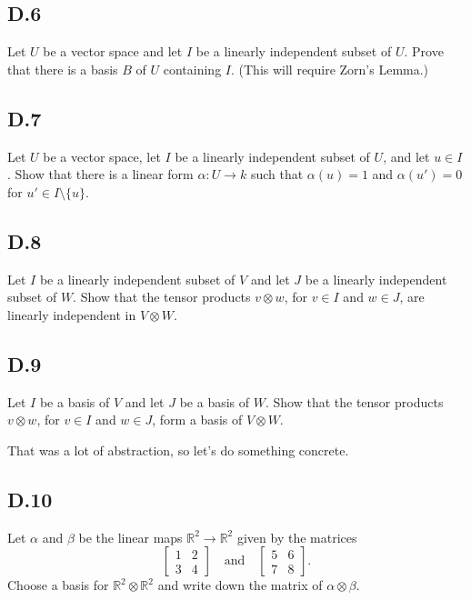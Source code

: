 \documentclass[lang=cn,11pt]{template}
\begin{document}
\subsection*{D.6} Let \( U \) be a vector space and let \( I \) be a linearly independent subset of \( U \). Prove that there is a basis \( B \) of \( U \) containing \( I \). (This will require Zorn’s Lemma.)

\subsection*{D.7} Let \( U \) be a vector space, let \( I \) be a linearly independent subset of \( U \), and let \( u \in I \). Show that there is a linear form \( \alpha : U \to k \) such that \( \alpha(u) = 1 \) and \( \alpha(u') = 0 \) for \( u' \in I \setminus \{u\} \).

\subsection*{D.8} Let \( I \) be a linearly independent subset of \( V \) and let \( J \) be a linearly independent subset of \( W \). Show that the tensor products \( v \otimes w \), for \( v \in I \) and \( w \in J \), are linearly independent in \( V \otimes W \).

\subsection*{D.9} Let \( I \) be a basis of \( V \) and let \( J \) be a basis of \( W \). Show that the tensor products \( v \otimes w \), for \( v \in I \) and \( w \in J \), form a basis of \( V \otimes W \).

That was a lot of abstraction, so let’s do something concrete.

\subsection*{D.10} Let \( \alpha \) and \( \beta \) be the linear maps \( \mathbb{R}^2 \to \mathbb{R}^2 \) given by the matrices
\[
\begin{bmatrix} 1 & 2 \\ 3 & 4 \end{bmatrix} \quad \text{and} \quad \begin{bmatrix} 5 & 6 \\ 7 & 8 \end{bmatrix}.
\]
Choose a basis for \( \mathbb{R}^2 \otimes \mathbb{R}^2 \) and write down the matrix of \( \alpha \otimes \beta \).
\end{document}
